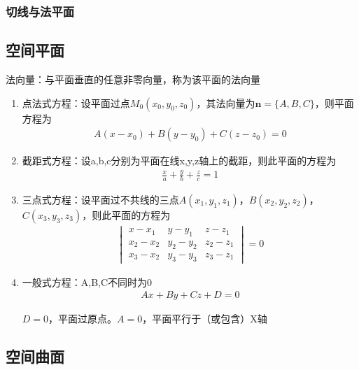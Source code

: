 \documentclass[12pt]{book}
\begin{document}
\subsubsection{切线与法平面}




\subsection{空间平面}

法向量：与平面垂直的任意非零向量，称为该平面的法向量

\begin{enumerate}[1.]
    \item 点法式方程：设平面过点$M_{0}(x_{0},y_{0},z_{0})$，其法向量为$\bm{n}=\{A,B,C\}$，则平面方程为
    \begin{gather*}
        A(x-x_{0})+B(y-y_{0})+C(z-z_{0})=0
    \end{gather*}
    \item 截距式方程：设a,b,c分别为平面在线x,y,z轴上的截距，则此平面的方程为
    \begin{gather*}
        \frac{x}{a}+\frac{y}{b}+\frac{z}{c}=1
    \end{gather*}
    \item 三点式方程：设平面过不共线的三点$A(x_1,y_1,z_1)$，$B(x_2,y_2,z_2)$，$C(x_3,y_3,z_3)$，则此平面的方程为
    \begin{gather*}
        \begin{vmatrix}
            x  -x_1 & y  -y_1 & z  -z_1 \\
            x_2-x_2 & y_2-y_2 & z_2-z_1 \\
            x_3-x_2 & y_3-y_3 & z_3-z_1 
        \end{vmatrix}
        =0
    \end{gather*}
    \item 一般式方程：A,B,C不同时为0
    \begin{gather*}
        Ax+By+Cz+D=0
    \end{gather*}
    \par $D=0$，平面过原点。$A=0$，平面平行于（或包含）X轴
\end{enumerate}











\subsection{空间曲面}
\end{document}
